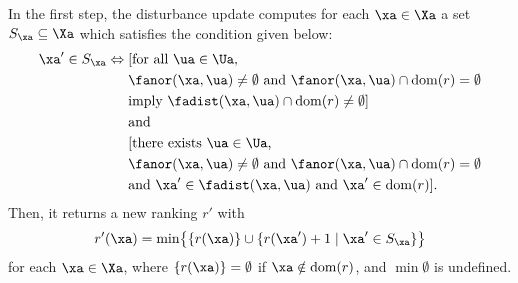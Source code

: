In the first step, the disturbance update computes for each $\xa \in \Xa$ a set $S_\xa\subseteq \Xa$ which satisfies the condition given below: 
% 
\begin{align*}
	\xa'\in S_\xa \Leftrightarrow {} & [\text{for all $\ua \in \Ua$,} \\
	& \fanor(\xa, \ua) \neq \emptyset \text{ and } \fanor(\xa, \ua) \cap \mathrm{dom}(r) = \emptyset \\
	& \text{imply } \fadist(\xa, \ua) \cap \mathrm{dom}(r) \neq \emptyset] \\
	& \text{and } \\
	& [\text{there exists $\ua \in \Ua$,} \\
	& \fanor(\xa, \ua) \neq \emptyset \text{ and } \fanor(\xa, \ua) \cap \mathrm{dom}(r) = \emptyset \\
	& \text{and } \xa' \in \fadist(\xa, \ua) \text{ and } \xa' \in \mathrm{dom}(r)].
\end{align*} 
Then, it returns a new ranking $r'$ with
\[ r'(\xa) = \min \bigl\{ \{ r(\xa) \} \cup \{ r(\xa') + 1 \mid \xa' \in S_\xa \} \bigr \} \]
for each $\xa \in \Xa$, where $\{ r(\xa) \} = \emptyset$ if $\xa \notin \mathrm{dom}(r)$, and $\min{\emptyset}$ is undefined. 


